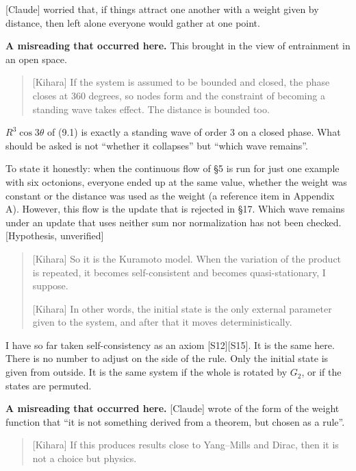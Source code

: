 \documentclass[
  a4paper,
]{article}
\begin{document}
{[}Claude{]} worried that, if things attract one another with a weight
given by distance, then left alone everyone would gather at one point.

\textbf{A misreading that occurred here.} This brought in the view of
entrainment in an open space.

\begin{quote}
{[}Kihara{]} If the system is assumed to be bounded and closed, the
phase closes at 360 degrees, so nodes form and the constraint of
becoming a standing wave takes effect. The distance is bounded too.
\end{quote}

\(R^3\cos3\theta\) of (9.1) is exactly a standing wave of order 3 on a
closed phase. What should be asked is not ``whether it collapses'' but
``which wave remains''.

To state it honestly: when the continuous flow of §5 is run for just one
example with six octonions, everyone ended up at the same value, whether
the weight was constant or the distance was used as the weight (a
reference item in Appendix A). However, this flow is the update that is
rejected in §17. Which wave remains under an update that uses neither
sum nor normalization has not been checked. {[}Hypothesis, unverified{]}

\begin{quote}
{[}Kihara{]} So it is the Kuramoto model. When the variation of the
product is repeated, it becomes self-consistent and becomes
quasi-stationary, I suppose.

{[}Kihara{]} In other words, the initial state is the only external
parameter given to the system, and after that it moves
deterministically.
\end{quote}

I have so far taken self-consistency as an axiom {[}S12{]}{[}S15{]}. It
is the same here. There is no number to adjust on the side of the rule.
Only the initial state is given from outside. It is the same system if
the whole is rotated by \(G_2\), or if the states are permuted.

\textbf{A misreading that occurred here.} {[}Claude{]} wrote of the form
of the weight function that ``it is not something derived from a
theorem, but chosen as a rule''.

\begin{quote}
{[}Kihara{]} If this produces results close to Yang--Mills and Dirac,
then it is not a choice but physics.
\end{quote}
\end{document}
